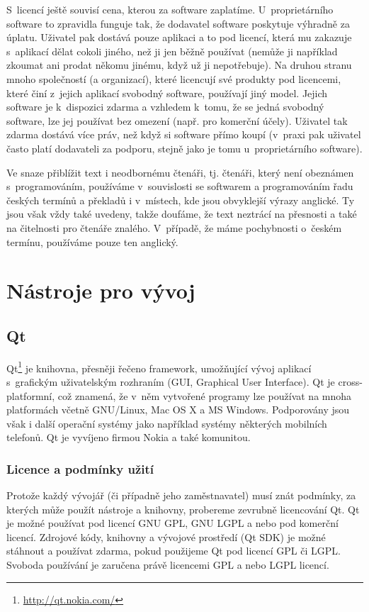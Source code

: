 \documentclass[a4paper,12pt]{article}
\begin{document}
S~licencí ještě souvisí cena, kterou za software zaplatíme.
U~proprietárního software to zpravidla funguje tak, že dodavatel software poskytuje výhradně za úplatu.
Uživatel pak dostává pouze aplikaci a to pod licencí, která mu zakazuje s~aplikací dělat cokoli jiného, než ji jen běžně používat (nemůže ji například zkoumat ani prodat někomu jinému, když už ji nepotřebuje).
Na druhou stranu mnoho společností (a organizací), které licencují své produkty pod licencemi, které činí z~jejich aplikací svobodný software, používají jiný model.
Jejich software je k~dispozici zdarma a vzhledem k~tomu, že se jedná svobodný software, lze jej používat bez omezení (např. pro komerční účely).
Uživatel tak zdarma dostává více práv, než když si software přímo koupí (v~praxi pak uživatel často platí dodavateli za podporu, stejně jako je tomu u~proprietárního software).

Ve snaze přiblížit text i neodbornému čtenáři, tj. čtenáři, který není obeznámen s~programováním, používáme v~souvislosti se softwarem a programováním řadu českých termínů a překladů i v~místech, kde jsou obvyklejší výrazy anglické.
Ty jsou však vždy také uvedeny, takže doufáme, že text neztrácí na přesnosti a také na čitelnosti pro čtenáře znalého.
V~případě, že máme pochybnosti o~českém termínu, používáme pouze ten anglický.

\section{Nástroje pro vývoj}

\subsection{Qt}
Qt\footnote{\url{http://qt.nokia.com/}} je knihovna, přesněji řečeno framework, umožňující vývoj aplikací s~grafickým uživatelským rozhraním (GUI, Graphical User Interface).
Qt je cross-platformní, což znamená, že v~něm vytvořené programy lze používat na mnoha platformách včetně GNU/Linux, Mac OS X a MS Windows.
Podporovány jsou však i další operační systémy jako například systémy některých mobilních telefonů.
Qt je vyvíjeno firmou Nokia a také komunitou.

\subsubsection{Licence a podmínky užití}
Protože každý vývojář (či případně jeho zaměstnavatel) musí znát podmínky, za kterých může použít nástroje a knihovny, probereme zevrubně licencování Qt.
Qt je možné používat pod licencí GNU GPL, GNU LGPL a nebo pod komerční licencí.
Zdrojové kódy, knihovny a vývojové prostředí (Qt SDK) je možné stáhnout a používat zdarma, pokud použijeme Qt pod licencí GPL či LGPL.
Svoboda používání je zaručena právě licencemi GPL a nebo LGPL licencí.
\end{document}
